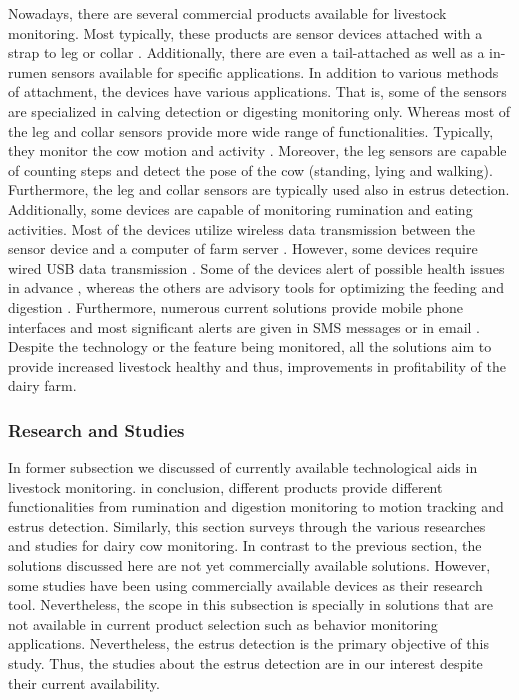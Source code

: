 \documentclass[english,12pt,a4paper,pdftex,elec,utf8]{aaltothesis}
\begin{document}
Nowadays, there are several commercial products available for livestock monitoring. Most typically, these products are sensor devices attached with a strap to leg \cite{iceroboticproductbrochure}\cite{geacowscout} or collar \cite{heatime}\cite{geacowscout}\cite{moocall}. Additionally, there are even a tail-attached \cite{moocall} as well as a in-rumen \cite{wellcowbolus} sensors available for specific applications. In addition to various methods of attachment, the devices have various applications. That is, some of the sensors are specialized in calving detection \cite{moocall} or digesting monitoring \cite{wellcowbolus} only. Whereas most of the leg and collar sensors provide more wide range of functionalities. Typically, they monitor the cow motion and activity \cite{iceroboticproductbrochure}\cite{heatime}\cite{geacowscout,}\cite{moocall}. Moreover, the leg sensors are capable of counting steps and detect the pose of the cow (standing, lying and walking). Furthermore, the leg and collar sensors are typically used also in estrus detection. Additionally, some devices are capable of monitoring rumination \cite{heatime} and eating \cite{geacowscout} activities. Most of the devices utilize wireless data transmission between the sensor device and a computer of farm server \cite{heatime} \cite{geacowscout} \cite{iceroboticproductbrochure} \cite{wellcowbolus}. However, some devices require wired USB data transmission \cite{iceroboticproductbrochure}. Some of the devices alert of possible health issues in advance \cite{heatime}\cite{geacowscout}\cite{iceroboticproductbrochure}, whereas the others are advisory tools for optimizing the feeding and digestion \cite{wellcowbolus}. Furthermore, numerous current solutions provide mobile phone interfaces and most significant alerts are given in SMS messages or in email \cite{heatime}. Despite the technology or the feature being monitored, all the solutions aim to provide increased livestock healthy and thus, improvements in profitability of the dairy farm.


\subsubsection{Research and Studies} \label{researchandstudiessection}

In former subsection we discussed of currently available technological aids in livestock monitoring. in conclusion, different products provide different functionalities from rumination and digestion monitoring to motion tracking and estrus detection. Similarly, this section surveys through the various researches and studies for dairy cow monitoring. In contrast to the previous section, the solutions discussed here are not yet commercially available solutions. However, some studies have been using commercially available devices as their research tool. Nevertheless, the scope in this subsection is specially in solutions that are not available in current product selection such as behavior monitoring applications. Nevertheless, the estrus detection is the primary objective of this study. Thus, the studies about the estrus detection are in our interest despite their current availability. 
\end{document}
